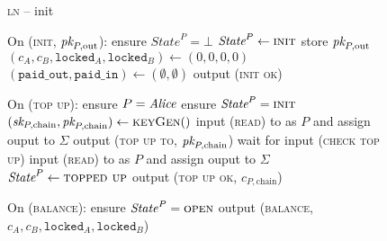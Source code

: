 \begin{figure}[H]
  \begin{processbox}{\textsc{ln} -- init}
    \begin{algorithmic}[1]
      \State {}
      \State {}
      \State On (\textsc{init}, $\textit{pk}_{P, \mathrm{out}}$):
      \Indent
        \State ensure $\textit{State}^P = \bot$
        \State $\textit{State}^P \gets \textsc{init}$
        \State store $\textit{pk}_{P, \mathrm{out}}$
        \State $(c_A, c_B, \texttt{locked}_A, \texttt{locked}_B) \gets (0, 0, 0,
        0)$
        \State $(\texttt{paid\_out}, \texttt{paid\_in}) \gets (\emptyset,
        \emptyset)$
        \State output (\textsc{init ok})
      \EndIndent
      \Statex

      \State On (\textsc{top up}):
      \Indent
        \State ensure $P = \mathit{Alice}$ 
        \State ensure $\textit{State}^P = \textsc{init}$
        \State $(\textit{sk}_{P, \mathrm{chain}}, \textit{pk}_{P, \mathrm{chain}}) \gets
        \textsc{keyGen}()$
        \State input (\textsc{read}) to \ledger as $P$ and assign ouput to
        $\Sigma$
        \State output (\textsc{top up to}, $\textit{pk}_{P, \mathrm{chain}}$)
          \State {}
          \State wait for input (\textsc{check top up})
          \State input (\textsc{read}) to \ledger as $P$ and assign ouput to
          $\Sigma$
        \EndWhile
        \State $\textit{State}^P \gets \textsc{topped up}$
        \State output (\textsc{top up ok}, $c_{P, \mathrm{chain}}$)
      \EndIndent
      \Statex

      \State On (\textsc{balance}):
      \Indent
        \State ensure $\mathit{State}^P = \textsc{open}$
        \label{code:functionality:chan:skeleton:base:balance:start}
        \State output (\textsc{balance}, $c_A, c_B, \texttt{locked}_A,
        \texttt{locked}_B$)
        \label{code:functionality:chan:skeleton:base:balance:end}
      \EndIndent
    \end{algorithmic}
  \end{processbox}
  \caption{}
  \label{code:ln:init}
\end{figure}

